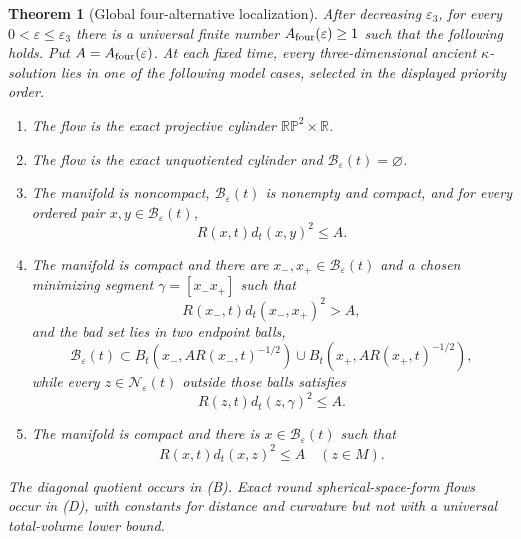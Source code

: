 \documentclass[10pt]{coll-l}
\newcommand{\R}{\mathbb{R}}
\newtheorem{theorem}{Theorem}[chapter]
\theoremstyle{definition}
\theoremstyle{remark}
\numberwithin{section}{chapter}
\numberwithin{equation}{chapter}
\begin{document}
\begin{theorem}[Global four-alternative localization]
\label{thm:ncs-four-alternatives}
After decreasing $\varepsilon_3$, for every
$0<\varepsilon\leq\varepsilon_3$ there is a universal finite number
$A_{\rm four}(\varepsilon)\geq1$ such that the following holds.  Put
$A=A_{\rm four}(\varepsilon)$.  At each fixed time, every
three-dimensional ancient $\kappa$-solution lies in one of the following
model cases, selected in the displayed priority order.
\begin{enumerate}
\item[(P)] The flow is the exact projective cylinder
      $\mathbb{RP}^2\times\R$.
\item[(A)] The flow is the exact unquotiented cylinder and
      $\mathscr B_\varepsilon(t)=\varnothing$.
\item[(B)] The manifold is noncompact,
      $\mathscr B_\varepsilon(t)$ is nonempty and compact, and for every
      ordered pair $x,y\in\mathscr B_\varepsilon(t)$,
      \begin{equation}
                         R(x,t)d_t(x,y)^2\leq A.        \label{eq:ncs-alternative-B}
      \end{equation}
\item[(C)] The manifold is compact and there are
      $x_-,x_+\in\mathscr B_\varepsilon(t)$ and a chosen minimizing segment
      $\gamma=[x_-x_+]$ such that
      \begin{equation}
           R(x_-,t)d_t(x_-,x_+)^2>A,                 \label{eq:ncs-C-remote-pair}
      \end{equation}
      and the bad set lies in two endpoint balls,
      \begin{equation}
       \mathscr B_\varepsilon(t)\subset
       B_t(x_-,A R(x_-,t)^{-1/2})
       \cup B_t(x_+,A R(x_+,t)^{-1/2}),                \label{eq:ncs-two-bad-clusters}
      \end{equation}
      while every $z\in\mathscr N_\varepsilon(t)$ outside those balls
      satisfies
      \begin{equation}
            R(z,t)d_t(z,\gamma)^2\leq A.               \label{eq:ncs-neck-close-to-axis}
      \end{equation}
\item[(D)] The manifold is compact and there is
      $x\in\mathscr B_\varepsilon(t)$ such that
      \begin{equation}
                         R(x,t)d_t(x,z)^2\leq A
                         \quad(z\in M).                 \label{eq:ncs-controlled-component-distance}
      \end{equation}
\end{enumerate}
The diagonal quotient occurs in (B).  Exact round spherical-space-form
flows occur in (D), with constants for distance and curvature but not with
a universal total-volume lower bound.
\end{theorem}
\end{document}
